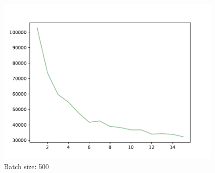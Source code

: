 \documentclass{article}
\begin{document}
\begin{figure}[!h]
{\begin{minipage}{0.21\linewidth}
  \includegraphics[scale=0.23]{imgs/test_loss_500.pdf}
  \end{minipage}
}
\quad
{}
\caption{ Batch size: 500}
\label{bs500}
\end{figure}
\end{document}
